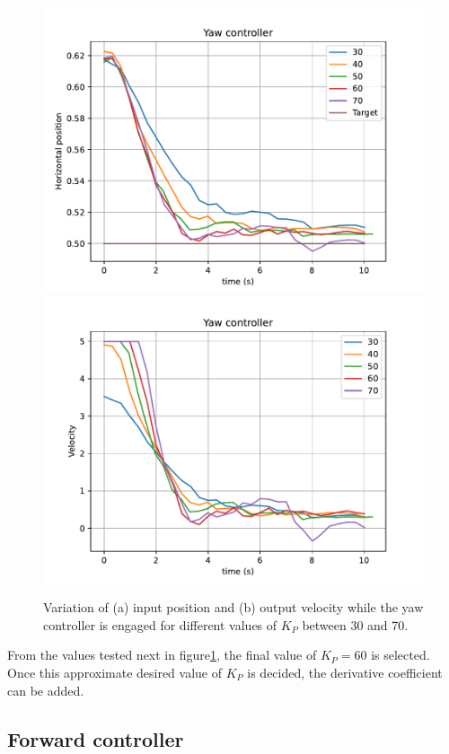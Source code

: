 \begin{figure}
  \centering
  \includegraphics[width=.45\linewidth]{img/4.1-tune/yaw_p2_feedback.pdf}
  \includegraphics[width=.45\linewidth]{img/4.1-tune/yaw_p2_speed.pdf}
  \caption{Variation of (a) input position and (b) output velocity while the yaw controller is engaged for different values of $K_{P}$ between 30 and 70.}\label{fig:tune-yaw-prop2}
\end{figure}

From the values tested next in figure\ref{fig:tune-yaw-prop2}, the final value of $K_{P}=60$ is selected.
Once this approximate desired value of $K_{P}$ is decided, the derivative coefficient can be added.



\subsection{Forward controller}

